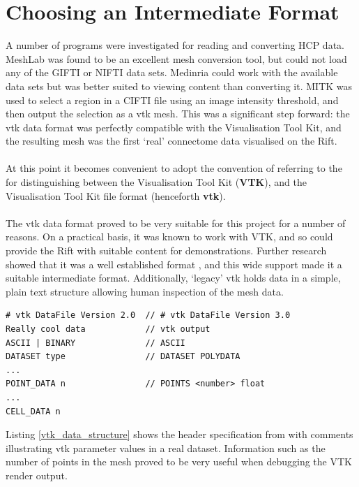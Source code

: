 \documentclass[MSc,paper=a4,pagesize=auto]{icldt}
\begin{document}
\section{Choosing an Intermediate Format}
\label{sec:choosing_an_intermediate_format}
A number of programs were investigated for reading and converting HCP data. MeshLab \cite{MeshLab2014} was found to be an excellent mesh conversion tool, but could not load any of the GIFTI or NIFTI data sets. Medinria \cite{MedInria2014} could work with the available data sets but was better suited to viewing content than converting it. MITK \cite{MITK2014} was used to select a region in a CIFTI file using an image intensity threshold, and then output the selection as a vtk mesh. This was a significant step forward: the vtk data format was perfectly compatible with the Visualisation Tool Kit, and the resulting mesh was the first `real' connectome data visualised on the Rift.
\\ \\
At this point it becomes convenient to adopt the convention of referring to the for distinguishing between the Visualisation Tool Kit (\textbf{VTK}), and the Visualisation Tool Kit file format (henceforth \textbf{vtk}). 
\\\\
The vtk data format proved to be very suitable for this project for a number of reasons. On a practical basis, it was known to work with VTK, and so could provide the Rift with suitable content for demonstrations. Further research showed that it was a well established format \cite{VTK_file_formats}, and this wide support made it a suitable intermediate format. Additionally, `legacy' vtk holds data in a simple, plain text structure allowing human inspection of the mesh data. 

\begin{lstlisting}[label=vtk_data_structure, caption=The structure of data in a legacy .vtk file.]
# vtk DataFile Version 2.0  // # vtk DataFile Version 3.0
Really cool data            // vtk output
ASCII | BINARY              // ASCII
DATASET type                // DATASET POLYDATA
...
POINT_DATA n                // POINTS <number> float
...
CELL_DATA n
\end{lstlisting}

Listing \ref{vtk_data_structure} shows the header specification from \cite{VTK_file_formats} with comments illustrating vtk parameter values in a real dataset. Information such as the number of points in the mesh proved to be very useful when debugging the VTK render output.
\end{document}
